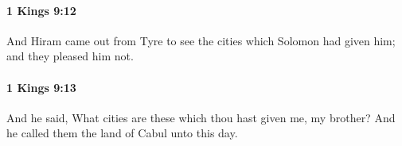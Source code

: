 		\paragraph{1 Kings 9:12} %
			\label{1KINGS-9-12}

			And Hiram came out from Tyre to see the cities which Solomon had given him; and they pleased him not.


		\paragraph{1 Kings 9:13} %
			\label{1KINGS-9-13}

			And he said, What cities are these which thou hast given me, my brother? And he called them the land of Cabul unto this day.


